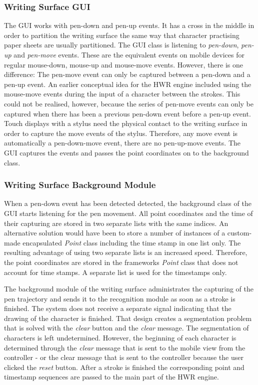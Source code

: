 \subsubsection{Writing Surface GUI}
\label{sec:hwre:writingsurfacegui}
The GUI works with pen-down and pen-up events. It has a cross in the middle in 
order to partition the writing surface the same way that character practising 
paper sheets are usually partitioned. The GUI class is listening to 
\emph{pen-down}, \emph{pen-up} and \emph{pen-move} events.
These are the equivalent events on 
mobile devices for regular mouse-down, mouse-up and mouse-move events. 
However, there is one difference: The pen-move event can only be captured 
between a pen-down and a pen-up event.
An earlier conceptual idea for the HWR engine included using the
mouse-move events during the input of a character between the strokes. 
This could not be realised, however, because the series of pen-move events 
can only be captured when there has been a previous pen-down event before a 
pen-up event. Touch displays with a stylus need the physical contact to the 
writing surface in order to capture the move events of the stylus.
Therefore, any move event is automatically a pen-down-move event,
there are no pen-up-move events.
The GUI captures the events and passes the point coordinates on to 
the background class.

\subsubsection{Writing Surface Background Module}
\label{sec:hwre:writingsurfacebackground}

When a pen-down event has been detected detected, the background class of 
the GUI starts listening for the pen movement. All point coordinates and the 
time of their capturing are stored in two separate lists with the same indices.
An alternative solution would have been to store a number of instances of a 
custom-made encapsulated \emph{Point} class including the time stamp in one 
list only. The resulting advantage of using two separate lists is an 
increased speed.
Therefore, the point coordinates are stored in the frameworks \emph{Point} class
that does not account for time stamps. A separate list is used for the
timestamps only.

The background module of the writing surface administrates the capturing 
of the pen trajectory and sends it to the recognition module as soon as a 
stroke is finished. The system does not receive a separate signal 
indicating that the drawing of the character is finished. That design creates a
segmentation problem that is solved with the \emph{clear} button and the 
\emph{clear} message. The segmentation of characters is left undetermined.
However, the beginning of each character is determined through the \emph{clear} 
message that is sent to the mobile view from the controller - or the clear 
message that is sent to the controller because the user clicked the 
\emph{reset} button.
After a stroke is finished the corresponding point and timestamp sequences are 
passed to the main part of the HWR engine.

